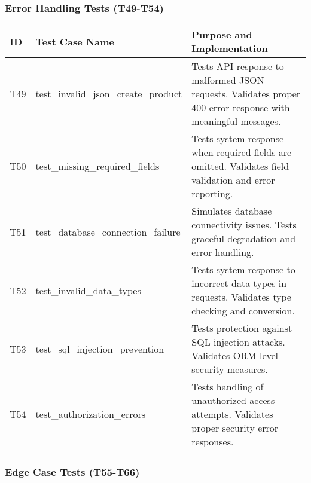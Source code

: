 \documentclass[12pt,a4paper]{article}
\begin{document}
\subsubsection{Error Handling Tests (T49-T54)}

\begin{longtable}{|p{1cm}|p{5cm}|p{8.5cm}|}
\hline
\rowcolor{red!20}
\textbf{ID} & \textbf{Test Case Name} & \textbf{Purpose and Implementation} \\
\hline
\endhead

T49 & test\_invalid\_json\_create\_product & Tests API response to malformed JSON requests. Validates proper 400 error response with meaningful messages. \\
\hline

T50 & test\_missing\_required\_fields & Tests system response when required fields are omitted. Validates field validation and error reporting. \\
\hline

T51 & test\_database\_connection\_failure & Simulates database connectivity issues. Tests graceful degradation and error handling. \\
\hline

T52 & test\_invalid\_data\_types & Tests system response to incorrect data types in requests. Validates type checking and conversion. \\
\hline

T53 & test\_sql\_injection\_prevention & Tests protection against SQL injection attacks. Validates ORM-level security measures. \\
\hline

T54 & test\_authorization\_errors & Tests handling of unauthorized access attempts. Validates proper security error responses. \\
\hline

\end{longtable}

\subsubsection{Edge Case Tests (T55-T66)}
\end{document}
